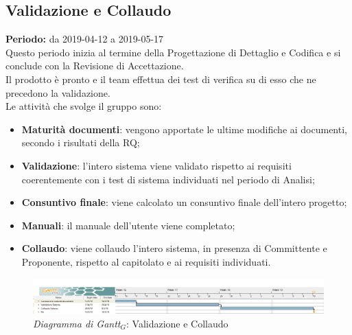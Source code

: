 \begin{flushleft}
\section{Validazione e Collaudo}
\textbf{Periodo:} da 2019-04-12 a 2019-05-17\\
Questo periodo inizia al termine della Progettazione di Dettaglio e Codifica e si conclude con la Revisione di Accettazione.\\
Il prodotto è pronto e il team effettua dei test di verifica su di esso che ne precedono la validazione.\\
Le attività che svolge il gruppo sono:
\begin{itemize}
   \item \textbf{Maturità documenti}: vengono apportate le ultime modifiche ai documenti, secondo i risultati della RQ;
   \item \textbf{Validazione}: l'intero sistema viene validato rispetto ai requisiti coerentemente con i test di sistema individuati nel periodo di Analisi;
   \item \textbf{Consuntivo finale}: viene calcolato un consuntivo finale dell'intero progetto;
   \item \textbf{Manuali}: il manuale dell'utente viene completato;
   \item \textbf{Collaudo}: viene collaudo l'intero sistema, in presenza di Committente e Proponente, rispetto al capitolato e ai requisiti individuati. 
\end{itemize}
\begin{figure} [h]
    \centering
    \includegraphics[scale=0.29]{./images/ZeroSevenGanttVerifica.png}
    \caption{\textit{Diagramma di Gantt$_{G}$}: Validazione e Collaudo }\label{G5}
\end{figure}
\end{flushleft}